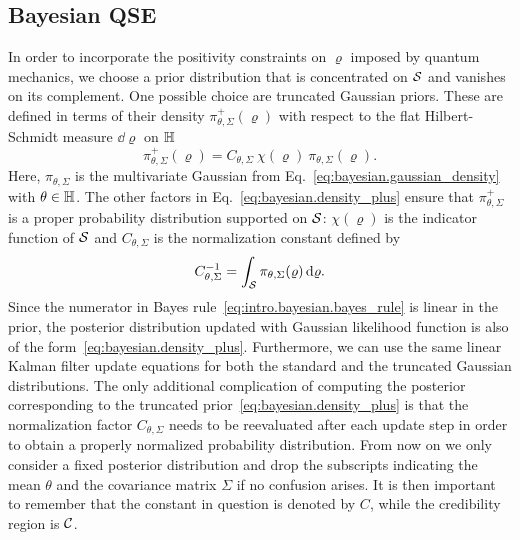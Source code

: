 \subsection{Bayesian QSE}
\label{sub:bayesian.tomography}

In order to incorporate the positivity constraints on $\varrho$ imposed by quantum mechanics, we choose a prior distribution that is concentrated on $\mathcal{S}$ and vanishes on its complement.
One possible choice are truncated Gaussian priors.
These are defined in terms of their density $\pi_{\theta,\Sigma}^+(\varrho)$ with respect to the flat Hilbert-Schmidt measure $\dd\varrho$ on $\mathbb{H}$
\begin{equation}
  \label{eq:bayesian.density_plus}
  \pi^+_{\theta,\Sigma}(\varrho) = C_{\theta,\Sigma}\ \chi(\varrho)\ \pi_{\theta,\Sigma}(\varrho).
\end{equation}
Here, $\pi_{\theta,\Sigma}$ is the multivariate Gaussian from Eq.~\eqref{eq:bayesian.gaussian_density} with $\theta \in \mathbb{H}$.
The other factors in Eq.~\eqref{eq:bayesian.density_plus} ensure that $\pi^+_{\theta,\Sigma}$ is a proper probability distribution supported on $\mathcal{S}$:
$\chi(\varrho)$ is the indicator function of $\mathcal{S}$ and $C_{\theta,\Sigma}$ is the normalization constant defined by
\begin{equation}
  \label{eq:bayes.normalization_factor}
  C_{\theta,\Sigma}^{-1} = \int_{\mathcal{S}} \pi_{\theta,\Sigma}(\varrho) \,\mathrm{d}\varrho.
\end{equation}
Since the numerator in Bayes rule~\eqref{eq:intro.bayesian.bayes_rule} is linear in the prior, the posterior distribution updated with Gaussian likelihood function is also of the form~\eqref{eq:bayesian.density_plus}.
Furthermore, we can use the same linear Kalman filter update equations for both the standard and the truncated Gaussian distributions.
The only additional complication of computing the posterior corresponding to the truncated prior~\eqref{eq:bayesian.density_plus} is that the normalization factor $C_{\theta,\Sigma}$ needs to be reevaluated after each update step in order to obtain a properly normalized probability distribution.
From now on we only consider a fixed posterior distribution and drop the subscripts indicating the mean $\theta$ and the covariance matrix $\Sigma$ if no confusion arises.
It is then important to remember that the constant in question is denoted by $C$, while the credibility region is $\mathcal{C}$.

